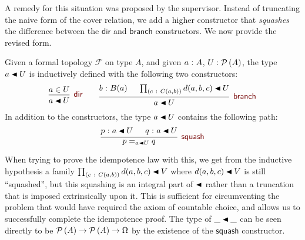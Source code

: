 A remedy for this situation was proposed by the supervisor. Instead of truncating the
naive form of the cover relation, we add a higher constructor that \emph{squashes} the
difference between the $\mathsf{dir}$ and $\mathsf{branch}$ constructors. We now provide
the revised form.
\begin{defn}\label{defn:covering}
  Given a formal topology
  $\mathcal{F}$ on type $A$, and given $a\hspace{0.1mm}:\hspace{0.1mm}A$, $U : \mathcal{P}\left(A\right)$, the type
  $\covers{a}{U}$ is inductively defined with the following two constructors:
  \[
  \begin{prooftree}
    \hypo{ a \in U }
    \infer1[$\ruledir{}$]{\covers{a}{U}}
  \end{prooftree}
  \qquad
  \begin{prooftree}
    \hypo{\oftyI{b}{B(a)}}
    \hypo{\pity{c}{C(a, b)}{\covers{d(a, b, c)}{U}}}
    \infer2[$\rulebranch{}$]{\covers{a}{U}}
  \end{prooftree}
  \]
  In addition to the constructors, the type $\covers{a}{U}$ contains the following path:
  \begin{equation*}
    \begin{prooftree}
      \hypo{\oftyI{p}{\covers{a}{U}}}
      \hypo{\oftyI{q}{\covers{a}{U}}}
      \infer2[$\rulesquash{}$]{p =_{\covers{a}{U}} q}
    \end{prooftree}
  \end{equation*}
\end{defn}

When trying to prove the idempotence law with this, we get from the inductive hypothesis a
family $\pity{c}{C(a, b)}{\covers{d(a, b, c)}{V}}$ where $\covers{d(a, b, c)}{V}$ is still
``squashed'', but this squashing is an integral part of $\covers{}{}$ rather than a
truncation that is imposed extrinsically upon it. This is sufficient for circumventing the
problem that would have required the axiom of countable choice, and allows us to
successfully complete the idempotence proof. The type of $\covers{\_}{\_}$ can be seen
directly to be $\mathcal{P}\left(A\right) \rightarrow \mathcal{P}\left(A\right) \rightarrow \Omega$ by the existence of the $\mathsf{squash}$
constructor.

